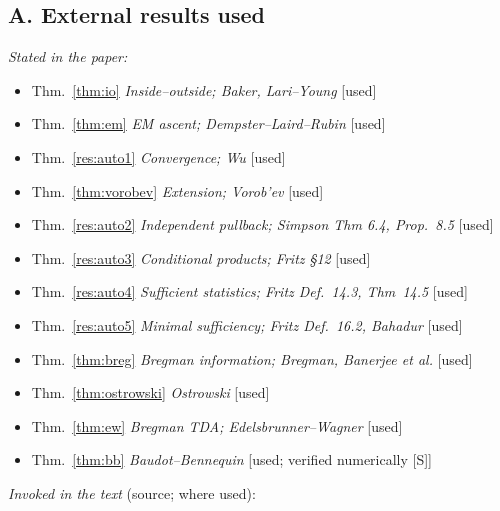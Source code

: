 \documentclass[11pt]{article}
\theoremstyle{definition}
\theoremstyle{remark}
\newcommand{\src}[1]{\textsf{\small[#1]}}
\begin{document}
\subsection*{A. External results used}
\noindent\emph{Stated in the paper:}
\begin{itemize}[itemsep=0pt]
  \item Thm.~\ref{thm:io} \emph{Inside--outside; Baker, Lari--Young} [used]
  \item Thm.~\ref{thm:em} \emph{EM ascent; Dempster--Laird--Rubin} [used]
  \item Thm.~\ref{res:auto1} \emph{Convergence; Wu} [used]
  \item Thm.~\ref{thm:vorobev} \emph{Extension; Vorob'ev} [used]
  \item Thm.~\ref{res:auto2} \emph{Independent pullback; Simpson Thm 6.4, Prop.~8.5} [used]
  \item Thm.~\ref{res:auto3} \emph{Conditional products; Fritz \S12} [used]
  \item Thm.~\ref{res:auto4} \emph{Sufficient statistics; Fritz Def.~14.3, Thm~14.5} [used]
  \item Thm.~\ref{res:auto5} \emph{Minimal sufficiency; Fritz Def.~16.2, Bahadur} [used]
  \item Thm.~\ref{thm:breg} \emph{Bregman information; Bregman, Banerjee et al.} [used]
  \item Thm.~\ref{thm:ostrowski} \emph{Ostrowski} [used]
  \item Thm.~\ref{thm:ew} \emph{Bregman TDA; Edelsbrunner--Wagner} [used]
  \item Thm.~\ref{thm:bb} \emph{Baudot--Bennequin} [used; verified numerically \src{S}]
\end{itemize}
\noindent\emph{Invoked in the text} (source; where used):
\end{document}
